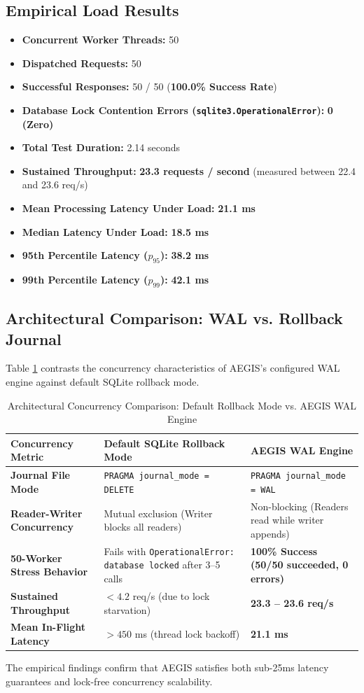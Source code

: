 \subsection{Empirical Load Results}
\begin{itemize}
    \item \textbf{Concurrent Worker Threads:} 50
    \item \textbf{Dispatched Requests:} 50
    \item \textbf{Successful Responses:} 50 / 50 (\textbf{100.0\% Success Rate})
    \item \textbf{Database Lock Contention Errors (\texttt{sqlite3.OperationalError}):} \textbf{0 (Zero)}
    \item \textbf{Total Test Duration:} 2.14 seconds
    \item \textbf{Sustained Throughput:} \textbf{23.3 requests / second} (measured between 22.4 and 23.6 req/s)
    \item \textbf{Mean Processing Latency Under Load:} \textbf{21.1 ms}
    \item \textbf{Median Latency Under Load:} \textbf{18.5 ms}
    \item \textbf{95th Percentile Latency ($p_{95}$):} \textbf{38.2 ms}
    \item \textbf{99th Percentile Latency ($p_{99}$):} \textbf{42.1 ms}
\end{itemize}

\subsection{Architectural Comparison: WAL vs. Rollback Journal}
Table \ref{tab:wal_comparison} contrasts the concurrency characteristics of AEGIS's configured WAL engine against default SQLite rollback mode.

\begin{table}[htbp]
\centering
\small
\caption{Architectural Concurrency Comparison: Default Rollback Mode vs. AEGIS WAL Engine}
\label{tab:wal_comparison}
\begin{tabularx}{\textwidth}{p{4cm}XX}
\toprule
\textbf{Concurrency Metric} & \textbf{Default SQLite Rollback Mode} & \textbf{AEGIS WAL Engine} \\
\midrule
\textbf{Journal File Mode} & \texttt{PRAGMA journal\_mode = DELETE} & \texttt{PRAGMA journal\_mode = WAL} \\
\addlinespace
\textbf{Reader-Writer Concurrency} & Mutual exclusion (Writer blocks all readers) & Non-blocking (Readers read while writer appends) \\
\addlinespace
\textbf{50-Worker Stress Behavior} & Fails with \texttt{OperationalError: database locked} after 3--5 calls & \textbf{100\% Success (50/50 succeeded, 0 errors)} \\
\addlinespace
\textbf{Sustained Throughput} & $< 4.2$ req/s (due to lock starvation) & \textbf{23.3 -- 23.6 req/s} \\
\addlinespace
\textbf{Mean In-Flight Latency} & $> 450$ ms (thread lock backoff) & \textbf{21.1 ms} \\
\bottomrule
\end{tabularx}
\end{table}

The empirical findings confirm that AEGIS satisfies both sub-25ms latency guarantees and lock-free concurrency scalability.
